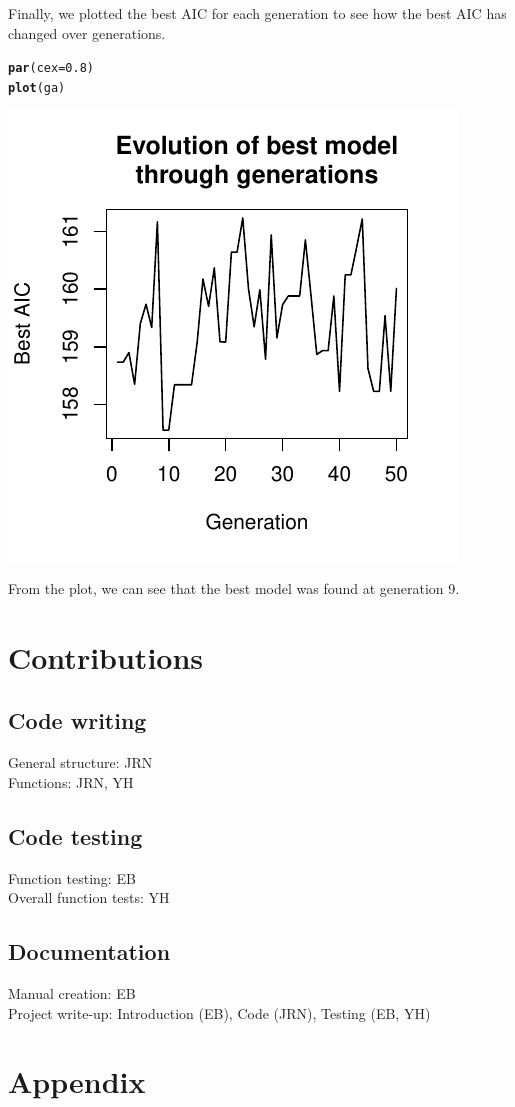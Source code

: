 \documentclass[11pt]{article}
\makeatletter
\def\maxwidth{ %
  \ifdim\Gin@nat@width>\linewidth
    \linewidth
  \else
    \Gin@nat@width
  \fi
}
\newcommand{\hlnum}[1]{\textcolor[rgb]{0.686,0.059,0.569}{#1}}%
\newcommand{\hlstd}[1]{\textcolor[rgb]{0.345,0.345,0.345}{#1}}%
\newcommand{\hlkwc}[1]{\textcolor[rgb]{0.333,0.667,0.333}{#1}}%
\newcommand{\hlkwd}[1]{\textcolor[rgb]{0.737,0.353,0.396}{\textbf{#1}}}%
\newenvironment{kframe}{%
 \def\at@end@of@kframe{}%
 \ifinner\ifhmode%
  \def\at@end@of@kframe{\end{minipage}}%
  \begin{minipage}{\columnwidth}%
 \fi\fi%
 \def\FrameCommand##1{\hskip\@totalleftmargin \hskip-\fboxsep
 \colorbox{shadecolor}{##1}\hskip-\fboxsep
     \hskip-\linewidth \hskip-\@totalleftmargin \hskip\columnwidth}%
 \MakeFramed {\advance\hsize-\width
   \@totalleftmargin\z@ \linewidth\hsize
   \@setminipage}}%
 {\par\unskip\endMakeFramed%
 \at@end@of@kframe}
\newenvironment{knitrout}{}{} %
\makeatother
\begin{document}
Finally, we plotted the best AIC for each generation to see how the best AIC 
has changed over generations. 

\begin{knitrout}
\color{fgcolor}\begin{kframe}
\begin{alltt}
\hlkwd{par}\hlstd{(}\hlkwc{cex} \hlstd{=} \hlnum{0.8}\hlstd{)}
\hlkwd{plot}\hlstd{(ga)}
\end{alltt}
\end{kframe}
\includegraphics[width=\maxwidth]{figure/latex-unnamed-chunk-4} 


\end{knitrout}

From the plot, we can see that the best model was found at generation 9. 

\section{Contributions} 
\label{sec:contributions}
\subsection{Code writing}
General structure: JRN\\
Functions: JRN, YH

\subsection{Code testing}
Function testing: EB\\
Overall function tests: YH

\subsection{Documentation}
Manual creation: EB\\
Project write-up: Introduction (EB), Code (JRN), Testing (EB, YH)

\section{Appendix}
\label{sec:appendix}

\end{document}
